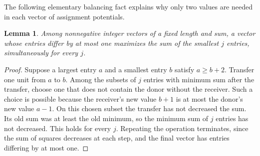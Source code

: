 \documentclass[10pt,a4paper]{amsart}
\numberwithin{equation}{section}
\newtheorem{lemma}[theorem]{Lemma}
\theoremstyle{definition}
\theoremstyle{remark}
\begin{document}
The following elementary balancing fact explains why only two values
are needed in each vector of assignment potentials.

\begin{lemma}\label{lem:mp:balancing}
Among nonnegative integer vectors of a fixed length and sum, a vector
whose entries differ by at most one maximizes the sum of the smallest
$j$ entries, simultaneously for every $j$.
\end{lemma}
\begin{proof}
Suppose a largest entry $a$ and a smallest entry $b$ satisfy
$a\ge b+2$. Transfer one unit from $a$ to $b$. Among the subsets of
$j$ entries with minimum sum after the transfer, choose one that does
not contain the donor without the receiver. Such a choice is possible
because the receiver's new value $b+1$ is at most the donor's new value
$a-1$. On this chosen subset the transfer has not decreased the sum.
Its old sum was at least the old minimum, so the minimum sum of $j$
entries has not decreased. This holds for every $j$. Repeating the
operation terminates, since the sum of squares decreases at each step,
and the final vector has entries differing by at most one.
\end{proof}
\end{document}
